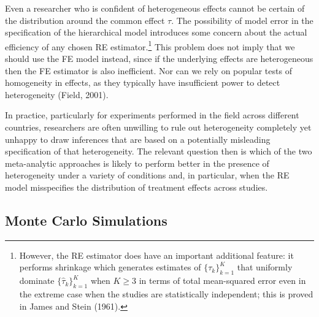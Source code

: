 \documentclass[12pt]{article}
\begin{document}
Even a researcher who is confident of heterogeneous effects cannot be certain of the distribution around the common effect $\tau$. The possibility of model error in the specification of the hierarchical model introduces some concern about the actual efficiency of any chosen RE estimator.\footnote{However, the RE estimator does have an important additional feature: 
it performs shrinkage which generates estimates of  $\{{\tau}_k\}_{k=1}^K$ that uniformly dominate $\{\hat{\tau}_k\}_{k=1}^K$ when $K \geq 3$ in terms of total mean-squared error even in the extreme case when the studies are statistically independent; this is proved in James and Stein (1961).} This problem does not imply that we should use the FE model instead, since if the underlying effects are heterogeneous then the FE estimator is also inefficient. Nor can we rely on popular tests of homogeneity in effects, as they typically have insufficient power to detect heterogeneity (Field, 2001). 

In practice, particularly for experiments performed in the field across different countries, researchers are often unwilling to rule out heterogeneity completely yet unhappy to draw inferences that are based on a potentially misleading specification of that heterogeneity. The relevant question then is which of the two meta-analytic approaches is likely to perform better in the presence of heterogeneity under a variety of conditions and, in particular, when the RE model misspecifies the distribution of treatment effects across studies.




\subsection{Monte Carlo Simulations} \label{section:simulations}


\end{document}
